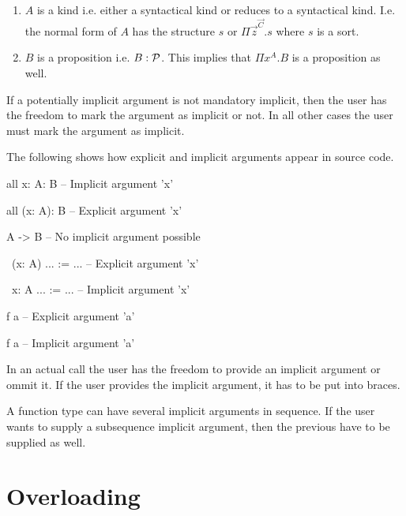 \begin{enumerate}

\item
    $A$ is a kind i.e. either a syntactical kind or reduces to a syntactical
        kind. I.e. the normal form of $A$ has the structure $s$ or $\Pi
        \vec{z}^\vec{C}.  s$ where $s$ is a sort.


\item
    $B$ is a proposition i.e. $B: {\cal{P}}$. This implies that $\Pi x^A. B$ is a
        proposition as well.

\end{enumerate}


If a potentially implicit argument is not mandatory implicit, then the user has
the freedom to mark the argument as implicit or not. In all other cases the user
must mark the argument as implicit.

The following shows how explicit and implicit arguments appear in source code.


\begin{alba}
    all {x: A}: B               -- Implicit argument 'x'

    all (x: A): B               -- Explicit argument 'x'

    A -> B                      -- No implicit argument possible


    \ (x: A) ... := ...         -- Explicit argument 'x'

    \ {x: A} ... := ...         -- Implicit argument 'x'


    f a                         -- Explicit argument 'a'

    f {a}                       -- Implicit argument 'a'
\end{alba}
%
In an actual call the user has the freedom to provide an implicit argument or
ommit it. If the user provides the implicit argument, it has to be put into
braces.

A function type can have several implicit arguments in sequence. If the user
wants to supply a subsequence implicit argument, then the previous have to be
supplied as well.











\vskip 5mm
\section{Overloading}

